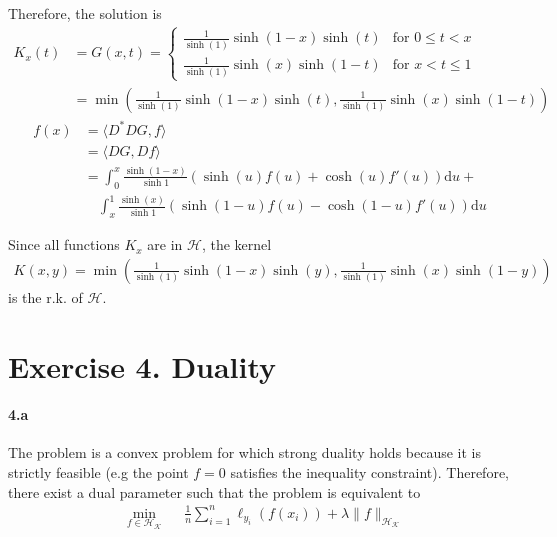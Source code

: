 \documentclass[10pt]{article}
\begin{document}
    Therefore, the solution is 
    \begin{align*}
    K_x(t) &= G(x, t) = \begin{cases}
        \frac{1}{\sinh(1)}\sinh(1-x)\sinh(t)  & \text{for } 0\leq t < x\\
        \frac{1}{\sinh(1)}\sinh(x)\sinh(1 - t)& \text{for } x < t\leq 1
    \end{cases}\\
    & = \min\left(\frac{1}{\sinh(1)}\sinh(1-x)\sinh(t), 
    \frac{1}{\sinh(1)}\sinh(x)\sinh(1 - t)\right) 
    \end{align*}
    \begin{align*}
        f(x) &= \langle D^* D G, f \rangle\\
        & = \langle  D G, Df \rangle  \\
        &= \int_0^x \frac{\sinh(1-x)}{\sinh 1} 
        (\sinh(u)f(u) + \cosh(u)f'(u ) )\text{d}u + \\
        &\quad \int_x^1  \frac{\sinh(x)}{\sinh 1} 
        (\sinh(1-u)f(u) - \cosh(1- u)f'(u))\text{d}u
    \end{align*}

    Since all functions $K_x$ are in $\mathcal{H}$, the kernel 
    \begin{align*}
        K(x, y) = \min\left(\frac{1}{\sinh(1)}\sinh(1-x)\sinh(y), 
        \frac{1}{\sinh(1)}\sinh(x)\sinh(1 - y)\right) 
    \end{align*}
    is the r.k. of $\mathcal{H}$.
    \section*{Exercise 4. Duality}
    \paragraph{4.a} The problem is a convex problem for which strong duality 
    holds because it is strictly feasible (e.g the point $f=0$ satisfies the
    inequality constraint). Therefore, there exist a dual parameter such that
    the problem is equivalent to 
    \begin{equation*}
        \begin{aligned}
        & \underset{f\in\mathcal{H}_\mathcal{K}}{\text{min}}
        & & \frac{1}{n}\sum_{i=1}^n \ell_{y_i}(f(x_i)) + \lambda \lVert f
        \rVert_{\mathcal{H}_\mathcal{K}}\\
        \end{aligned}
    \end{equation*}
\end{document}
